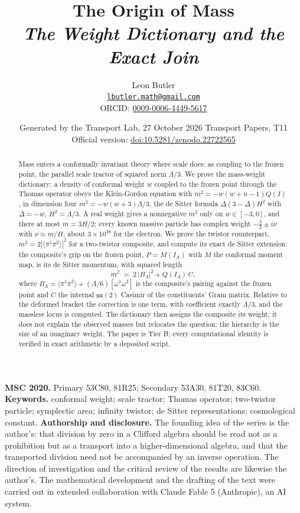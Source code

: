 \documentclass[11pt]{article}
\title{\bfseries The Origin of Mass\\[4pt]\large\itshape The Weight Dictionary and the Exact Join}
\author{Leon Butler\\ \normalsize\href{mailto:lbutler.math@gmail.com}{\texttt{lbutler.math@gmail.com}}\\ \normalsize ORCID: \href{https://orcid.org/0009-0006-4449-5617}{0009-0006-4449-5617}}
\date{Generated by the Transport Lab, 27 October 2026 \textperiodcentered{} Transport Papers, T11\\[3pt]\small Official version: \href{https://doi.org/10.5281/zenodo.22722565}{doi:10.5281/zenodo.22722565}}
\theoremstyle{definition}
\theoremstyle{plain}
\providecommand{\br}{}\renewcommand{\br}[1]{\langle #1\rangle}
\begin{document}
\maketitle
\begin{abstract}
\normalsize
Mass enters a conformally invariant theory where scale does: as coupling to the frozen point, the parallel scale tractor of squared norm $\Lambda/3$. We prove the mass-weight dictionary: a density of conformal weight $w$ coupled to the frozen point through the Thomas operator obeys the Klein-Gordon equation with $m^{2} = -w(w+n-1)Q(I)$, in dimension four $m^{2} = -w(w+3)\Lambda/3$, the de Sitter formula $\Delta(3-\Delta)H^{2}$ with $\Delta = -w$, $H^{2} = \Lambda/3$. A real weight gives a nonnegative $m^{2}$ only on $w \in [-3,0]$, and there at most $m = 3H/2$; every known massive particle has complex weight $-\tfrac32 \pm i\nu$ with $\nu \approx m/H$, about $3 \times 10^{38}$ for the electron. We prove the twistor counterpart, $m^{2} = 2|\br{\pi^{1}\pi^{2}}|^{2}$ for a two-twistor composite, and compute its exact de Sitter extension: the composite's grip on the frozen point, $P = M(I_{\Lambda})$ with $M$ the conformal moment map, is its de Sitter momentum, with squared length
\[
m^{2} \;=\; 2\,|B_{\Lambda}|^{2} + Q(I_{\Lambda})\, C,
\]
where $B_{\Lambda} = \br{\pi^{1}\pi^{2}} + (\Lambda/6)[\omega^{1}\omega^{2}]$ is the composite's pairing against the frozen point and $C$ the internal $\mathfrak{su}(2)$ Casimir of the constituents' Gram matrix. Relative to the deformed bracket the correction is one term, with coefficient exactly $\Lambda/3$, and the massless locus is computed. The dictionary then assigns the composite its weight; it does not explain the observed masses but relocates the question: the hierarchy is the size of an imaginary weight. The paper is Tier B; every computational identity is verified in exact arithmetic by a deposited script.
\end{abstract}
\medskip
\noindent\textbf{MSC 2020.} Primary 53C80, 81R25; Secondary 53A30, 81T20, 83C60.\\
\textbf{Keywords.} conformal weight; scale tractor; Thomas operator; two-twistor particle; symplectic area; infinity twistor; de Sitter representations; cosmological constant.
\newpage
\noindent \textbf{Authorship and disclosure. }The founding idea of the series is the author's: that division by zero in a Clifford algebra should be read not as a prohibition but as a transport into a higher-dimensional algebra, and that the transported division need not be accompanied by an inverse operation. The direction of investigation and the critical review of the results are likewise the author's. The mathematical development and the drafting of the text were carried out in extended collaboration with Claude Fable 5 (Anthropic), an AI system.
\end{document}
